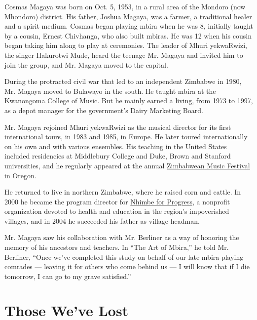 Cosmas Magaya was born on Oct. 5, 1953, in a rural area of the Mondoro
(now Mhondoro) district. His father, Joshua Magaya, was a farmer, a
traditional healer and a spirit medium. Cosmas began playing mbira when
he was 8, initially taught by a cousin, Ernest Chivhanga, who also built
mbiras. He was 12 when his cousin began taking him along to play at
ceremonies. The leader of Mhuri yekwaRwizi, the singer Hakurotwi Mude,
heard the teenage Mr. Magaya and invited him to join the group, and Mr.
Magaya moved to the capital.

During the protracted civil war that led to an independent Zimbabwe in
1980, Mr. Magaya moved to Bulawayo in the south. He taught mbira at the
Kwanongoma College of Music. But he mainly earned a living, from 1973 to
1997, as a depot manager for the government's Dairy Marketing Board.

Mr. Magaya rejoined Mhuri yekwaRwizi as the musical director for its
first international tours, in 1983 and 1985, in Europe. He
\href{https://www.nytimes3xbfgragh.onion/1999/11/09/arts/music-review-ancient-resonance-in-twinkling-syncopations.html}{later
toured internationally} on his own and with various ensembles. His
teaching in the United States included residencies at Middlebury College
and Duke, Brown and Stanford universities, and he regularly appeared at
the annual \href{https://zimfest.org/}{Zimbabwean Music Festival} in
Oregon.

He returned to live in northern Zimbabwe, where he raised corn and
cattle. In 2000 he became the program director for
\href{https://ancient-ways.org/regions/zimbabwe-nhimbe-for-progress/}{Nhimbe
for Progress}, a nonprofit organization devoted to health and education
in the region's impoverished villages, and in 2004 he succeeded his
father as village headman.

Mr. Magaya saw his collaboration with Mr. Berliner as a way of honoring
the memory of his ancestors and teachers. In ``The Art of Mbira,'' he
told Mr. Berliner, ``Once we've completed this study on behalf of our
late mbira-playing comrades --- leaving it for others who come behind us
--- I will know that if I die tomorrow, I can go to my grave
satisfied.''

\href{https://www.nytimes3xbfgragh.onion/interactive/2020/obituaries/people-died-coronavirus-obituaries.html?action=click\&pgtype=Article\&state=default\&region=BELOW_MAIN_CONTENT\&context=covid_obits_promo}{}

\hypertarget{those-weve-lost}{%
\section{Those We've Lost}\label{those-weve-lost}}

